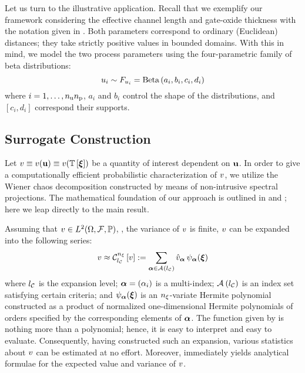 Let us turn to the illustrative application.
Recall that we exemplify our framework considering the effective channel length and gate-oxide thickness with the notation given in .
Both parameters correspond to ordinary (Euclidean) distances; they take strictly positive values in bounded domains.
With this in mind, we model the two process parameters using the four-parametric family of beta distributions:
\begin{equation*}
  u_i \sim F_{u_i} = \text{Beta}\left( a_i, b_i, c_i, d_i \right)
\end{equation*}
where $i = 1, \dots, {n_\text{u}} {n_\text{p}}$, $a_i$ and $b_i$ control the shape of the distributions, and $[ c_i, d_i ]$ correspond their supports.

\subsection{Surrogate Construction}
Let $\w \equiv \w(\vu) \equiv \w(\transformation{\vz})$ be a quantity of interest dependent on $\mathbf{u}$.
In order to give a computationally efficient probabilistic characterization of $v$, we utilize the Wiener chaos decomposition constructed by means of non-intrusive spectral projections.
The mathematical foundation of our approach is outlined in  and ; here we leap directly to the main result.

Assuming that $v \in L^{2}(\Omega, \mathcal{F}, \mathbb{P})$, \ie, the variance of $v$ is finite, $v$ can be expanded into the following series:
\begin{equation} \elab{spectral-decomposition}
  \w \approx \chaos{\nvars}{\nclevel}{\w} := \sum_{\multiindex \in \chaosMultiindexSet{\nclevel}} \coefficient{\w}_{\multiindex} \, \polynomial_{\multiindex}(\vz)
\end{equation}
where ${l_\mathcal{C}}$ is the expansion level; $\bm{\alpha} = (\alpha_i)$ is a multi-index; $\mathcal{A}_{}\left( {l_\mathcal{C}} \right)$ is an index set satisfying certain criteria; and $\psi_{\bm{\alpha}}(\bm{\xi})$ is an ${n_\xi}$-variate Hermite polynomial constructed as a product of normalized one-dimensional Hermite polynomials of orders specified by the corresponding elements of $\bm{\alpha}$.
The function given by  is nothing more than a polynomial; hence, it is easy to interpret and easy to evaluate.
Consequently, having constructed such an expansion, various statistics about $v$ can be estimated at no effort.
Moreover,  immediately yields analytical formulae for the expected value and variance of $v$.

